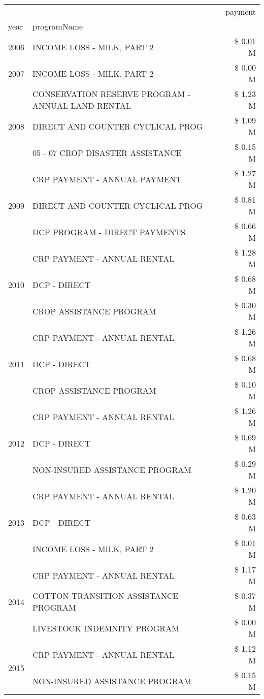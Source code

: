 \begin{tabular}{llr}
\toprule
 &  & payment \\
year & programName &  \\
\midrule
2006 & INCOME LOSS - MILK, PART 2 & \$ 0.01 M \\
\cline{1-3}
2007 & INCOME LOSS - MILK, PART 2 & \$ 0.00 M \\
\cline{1-3}
\multirow[t]{3}{*}{2008} & CONSERVATION RESERVE PROGRAM - ANNUAL LAND RENTAL & \$ 1.23 M \\
 & DIRECT AND COUNTER CYCLICAL PROG & \$ 1.09 M \\
 & 05 - 07 CROP DISASTER ASSISTANCE & \$ 0.15 M \\
\cline{1-3}
\multirow[t]{3}{*}{2009} & CRP PAYMENT - ANNUAL PAYMENT & \$ 1.27 M \\
 & DIRECT AND COUNTER CYCLICAL PROG & \$ 0.81 M \\
 & DCP PROGRAM - DIRECT PAYMENTS & \$ 0.66 M \\
\cline{1-3}
\multirow[t]{3}{*}{2010} & CRP PAYMENT - ANNUAL RENTAL & \$ 1.28 M \\
 & DCP - DIRECT & \$ 0.68 M \\
 & CROP ASSISTANCE PROGRAM & \$ 0.30 M \\
\cline{1-3}
\multirow[t]{3}{*}{2011} & CRP PAYMENT - ANNUAL RENTAL & \$ 1.26 M \\
 & DCP - DIRECT & \$ 0.68 M \\
 & CROP ASSISTANCE PROGRAM & \$ 0.10 M \\
\cline{1-3}
\multirow[t]{3}{*}{2012} & CRP PAYMENT - ANNUAL RENTAL & \$ 1.26 M \\
 & DCP - DIRECT & \$ 0.69 M \\
 & NON-INSURED ASSISTANCE PROGRAM & \$ 0.29 M \\
\cline{1-3}
\multirow[t]{3}{*}{2013} & CRP PAYMENT - ANNUAL RENTAL & \$ 1.20 M \\
 & DCP - DIRECT & \$ 0.63 M \\
 & INCOME LOSS - MILK, PART 2 & \$ 0.01 M \\
\cline{1-3}
\multirow[t]{3}{*}{2014} & CRP PAYMENT - ANNUAL RENTAL & \$ 1.17 M \\
 & COTTON TRANSITION ASSISTANCE PROGRAM & \$ 0.37 M \\
 & LIVESTOCK INDEMNITY PROGRAM & \$ 0.00 M \\
\cline{1-3}
\multirow[t]{3}{*}{2015} & CRP PAYMENT - ANNUAL RENTAL & \$ 1.12 M \\
 & NON-INSURED ASSISTANCE PROGRAM & \$ 0.15 M \\

\end{tabular}
